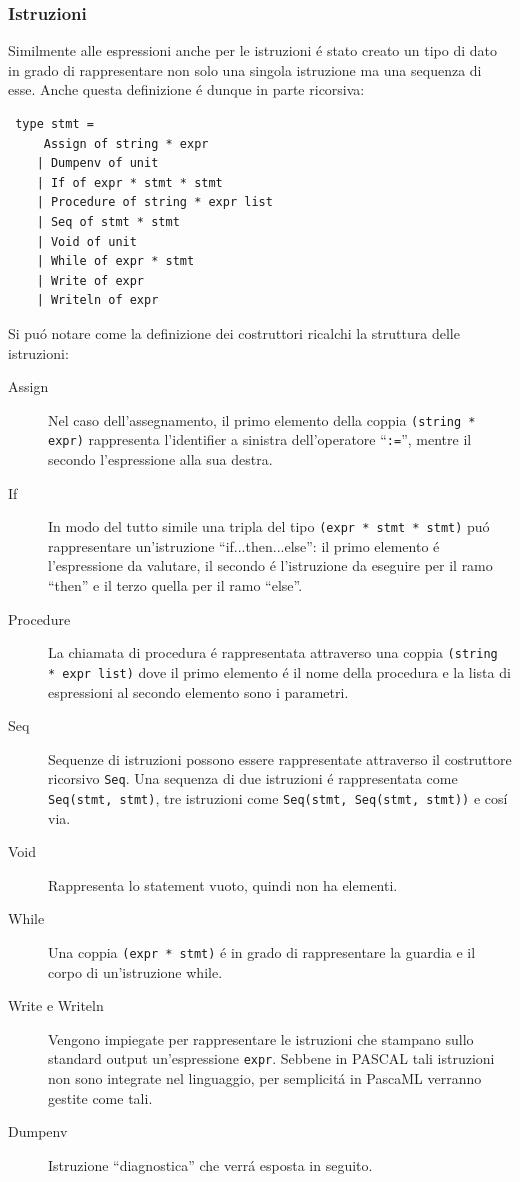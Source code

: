 \documentclass[a4paper,10pt]{article}
\begin{document}
\subsubsection{Istruzioni}
Similmente alle espressioni anche per le istruzioni \'e stato creato un tipo di
dato in grado di rappresentare non solo una singola istruzione ma una sequenza
di esse. Anche questa definizione \'e dunque in parte ricorsiva:

\begin{verbatim}
 type stmt =
     Assign of string * expr
    | Dumpenv of unit
    | If of expr * stmt * stmt
    | Procedure of string * expr list
    | Seq of stmt * stmt
    | Void of unit
    | While of expr * stmt
    | Write of expr
    | Writeln of expr
\end{verbatim}
Si pu\'o notare come la definizione dei costruttori ricalchi la struttura delle
istruzioni:
\begin{description}
 \item[Assign] Nel caso dell'assegnamento, il primo elemento della
coppia \verb|(string * expr)| rappresenta l'identifier a sinistra dell'operatore
``\verb|:=|'', mentre il secondo l'espressione alla sua destra.

\item[If] In modo del tutto simile una tripla del tipo 
\verb|(expr * stmt * stmt)| pu\'o rappresentare un'istruzione
``if...then...else'': il primo elemento \'e l'espressione da valutare, il
secondo \'e l'istruzione da eseguire per il ramo ``then'' e il terzo quella per
il ramo ``else''.

\item[Procedure] La chiamata di procedura \'e rappresentata attraverso una
coppia \verb|(string * expr list)| dove il primo elemento \'e il nome della
procedura e la lista di espressioni al secondo elemento sono i parametri.

\item[Seq] Sequenze di istruzioni possono essere rappresentate attraverso il
costruttore ricorsivo \verb|Seq|. Una sequenza di due istruzioni \'e
rappresentata come \verb|Seq(stmt, stmt)|, tre istruzioni come
\verb|Seq(stmt, Seq(stmt, stmt))| e cos\'i via.

\item[Void] Rappresenta lo statement vuoto, quindi non ha elementi.

\item[While] Una coppia \verb|(expr * stmt)| \'e in grado di rappresentare la
guardia e il corpo di un'istruzione while.

\item[Write e Writeln] Vengono impiegate per rappresentare le istruzioni che
stampano sullo standard output un'espressione \verb|expr|. Sebbene in PASCAL
tali istruzioni non sono integrate nel linguaggio, per semplicit\'a in PascaML
verranno gestite come tali.

\item[Dumpenv] Istruzione ``diagnostica'' che verr\'a esposta in seguito.
\end{description}
\end{document}
